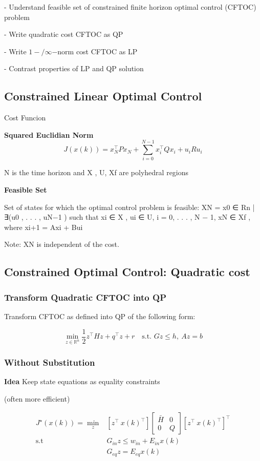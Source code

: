 - Understand feasible set of
constrained finite horizon optimal control (CFTOC) problem

- Write quadratic cost CFTOC as QP

- Write $1−/ \infty$−norm cost CFTOC as LP

- Contrast properties of LP and QP solution

\subsection{Constrained Linear Optimal Control}

Cost Funcion

\textbf{Squared Euclidian Norm}
\[
	J(x(k)) = x_N^\top P x_N + \sum_{i=0}^{N-1}x_i^\top Q x_i + u_i R u_i
\]

N is the time horizon and X , U, Xf are polyhedral regions

\textbf{Feasible Set}

Set of states for which the optimal control problem is feasible:
XN =
{x0 ∈ Rn | ∃(u0 , . . . , uN−1 ) such that xi ∈ X , ui ∈ U,
i = 0, . . . , N − 1, xN ∈ Xf , where xi+1 = Axi + Bui }

Note: XN is independent of the cost.

\subsection{Constrained Optimal Control: Quadratic cost}

\subsubsection{Transform Quadratic CFTOC into QP}

Transform CFTOC as defined into QP of the following form:

\[
	\min_{z\in\mathbb{R}^n}
	\textstyle\frac{1}{2}z^\top H z + q^\top z + r
	\quad\text{s.t. }Gz\leq h,\ Az = b
\]
\subsubsection{Without Substitution}

\textbf{Idea} Keep state equations as equality constraints

(often more efficient)

\[\begin{aligned}
		J^\star(x(k)) = \min_z & \left[ z^\top \ x(k)^\top \right]
		\left[\begin{smallmatrix} \bar{H} & 0 \\ 0 & Q \end{smallmatrix}\right]
		\left[ z^\top \ x(k)^\top \right]^\top                     \\
		\text{s.t}\quad        & G_{in}z \leq w_{in} + E_{in}x(k)  \\
		                       & G_{eq}z = E_{eq}x(k)
	\end{aligned}\]

